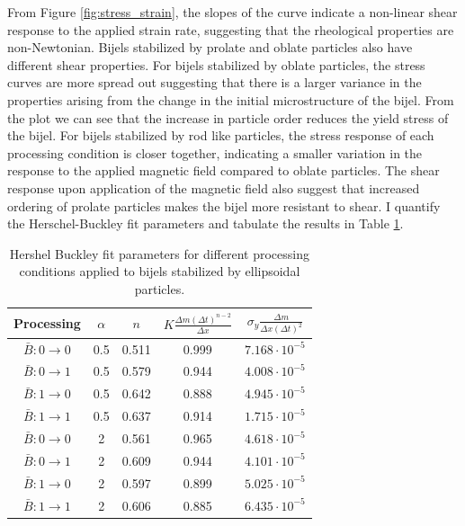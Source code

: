 From Figure \ref{fig:stress_strain}, the slopes of the curve indicate a non-linear shear response to the applied strain rate, suggesting that the rheological properties
are non-Newtonian. Bijels stabilized by prolate and oblate particles also have different shear properties. For bijels stabilized by oblate particles, the stress curves
are more spread out suggesting that there is a larger variance in the properties arising from the change in the initial microstructure of the bijel. From the plot
we can see that the increase in particle order reduces the yield stress of the bijel. For bijels stabilized by rod like particles, the stress response of each processing 
condition is closer together, indicating a smaller variation in the response to the applied magnetic field compared to oblate particles. The shear response upon application
of the magnetic field also suggest that increased ordering of prolate particles makes the bijel more resistant to shear. I quantify the Herschel-Buckley fit parameters and 
tabulate the results in Table \ref{table:rheology_fit}.

\begin{table}[h!]
    \centering
    \begin{tabular}{||c c c c c||} 
     \hline
     Processing & $\alpha$ & $n$ & $K \frac{\Delta m (\Delta t)^{n-2}}{\Delta x} $ & $\sigma_{y} \frac{\Delta m}{\Delta x (\Delta t)^2}$ \\ [0.5ex] 
     \hline\hline
     $\bar{B}: 0 \rightarrow 0$ & 0.5 & 0.511 & 0.999 & $7.168 \cdot 10^{-5}$ \\ 
     \hline
     $\bar{B}: 0 \rightarrow 1$ & 0.5 & 0.579 & 0.944 & $4.008 \cdot 10^{-5}$ \\
     \hline
     $\bar{B}: 1 \rightarrow 0$ & 0.5 & 0.642 & 0.888 & $4.945 \cdot 10^{-5}$ \\
     \hline
     $\bar{B}: 1 \rightarrow 1$ & 0.5 & 0.637 & 0.914 & $1.715 \cdot 10^{-5}$ \\
     \hline
     $\bar{B}: 0 \rightarrow 0$ & 2 & 0.561 & 0.965 & $4.618 \cdot 10^{-5}$ \\
     \hline
     $\bar{B}: 0 \rightarrow 1$ & 2 & 0.609 & 0.944 & $4.101 \cdot 10^{-5}$ \\
     \hline
     $\bar{B}: 1 \rightarrow 0$ & 2 & 0.597 & 0.899 & $5.025 \cdot 10^{-5}$ \\
     \hline
     $\bar{B}: 1 \rightarrow 1$ & 2 & 0.606 & 0.885 & $6.435 \cdot 10^{-5}$ \\ [1ex] 
     \hline
    \end{tabular}
    \caption{Hershel Buckley fit parameters for different processing conditions applied to bijels stabilized by ellipsoidal particles.}
    \label{table:rheology_fit}
\end{table}
 
